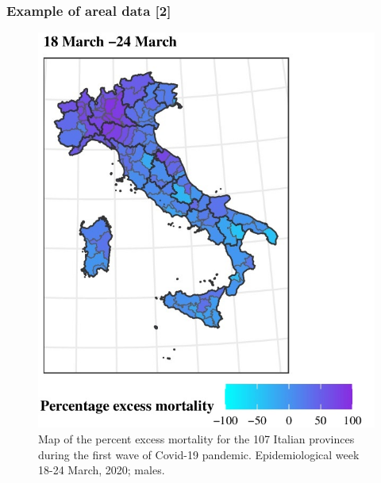 \documentclass[12pt]{beamer}
\begin{document}
\begin{frame}
\frametitle{Example of areal data [2]}
\begin{figure}
\includegraphics[scale=0.48]{Figures/Italy_Covid_March2020.jpg}
\caption{\footnotesize Map of the percent excess mortality for the 107 Italian provinces during the first wave of Covid-19 pandemic. Epidemiological week 18-24 March, 2020; males.}
\end{figure}
\end{frame}
\end{document}
